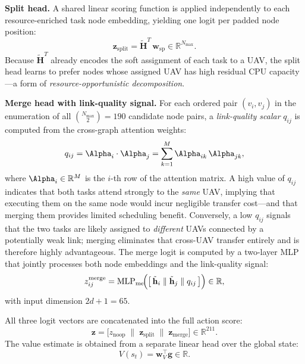 \noindent\textbf{Split head.}
A shared linear scoring function is applied independently to each
resource-enriched task node embedding, yielding one logit per
padded node position:
\begin{equation}
  \mathbf{z}_{\mathrm{split}} =
    \tilde{\mathbf{H}}^T\,\mathbf{w}_{\mathrm{sp}}
    \in \mathbb{R}^{N_{\max}}.
  \label{eq:z_split}
\end{equation}
Because $\tilde{\mathbf{H}}^T$ already encodes the soft assignment
of each task to a UAV, the split head learns to prefer nodes whose
assigned UAV has high residual CPU capacity—a form of
\emph{resource-opportunistic decomposition}.

\noindent\textbf{Merge head with link-quality signal.}
For each ordered pair $(v_i, v_j)$ in the enumeration of all
$\binom{N_{\max}}{2} = 190$ candidate node pairs, a
\textit{link-quality scalar} $q_{ij}$ is computed from the
cross-graph attention weights:
\begin{equation}
  q_{ij} = \boldsymbol{\Alpha}_i \cdot \boldsymbol{\Alpha}_j
          = \sum_{k=1}^{M} \Alpha_{ik}\,\Alpha_{jk},
  \label{eq:link_quality}
\end{equation}
where $\boldsymbol{\Alpha}_i \in \mathbb{R}^M$ is the $i$-th row of
the attention matrix.
A high value of $q_{ij}$ indicates that both tasks attend strongly to
the \emph{same} UAV, implying that executing them on the same node
would incur negligible transfer cost—and that merging them
provides limited scheduling benefit.
Conversely, a low $q_{ij}$ signals that the two tasks are likely
assigned to \emph{different} UAVs connected by a potentially weak
link; merging eliminates that cross-UAV transfer entirely and
is therefore highly advantageous.
The merge logit is computed by a two-layer MLP that jointly
processes both node embeddings and the link-quality signal:
\begin{equation}
  z_{ij}^{\mathrm{merge}} =
    \mathrm{MLP}_{\mathrm{me}}\!\Bigl(
      \bigl[\,
        \tilde{\mathbf{h}}_i \;\|\;
        \tilde{\mathbf{h}}_j \;\|\;
        q_{ij}
      \,\bigr]
    \Bigr) \in \mathbb{R},
  \label{eq:z_merge}
\end{equation}
with input dimension $2d + 1 = 65$.

All three logit vectors are concatenated into the full action score:
\begin{equation}
  \mathbf{z} = \bigl[
    z_{\mathrm{noop}}\;\|\;
    \mathbf{z}_{\mathrm{split}}\;\|\;
    \mathbf{z}_{\mathrm{merge}}
  \bigr] \in \mathbb{R}^{211}.
  \label{eq:logits}
\end{equation}
The value estimate is obtained from a separate linear head over
the global state:
\begin{equation}
  V(s_t) = \mathbf{w}_V^\top \mathbf{g} \in \mathbb{R}.
  \label{eq:value}
\end{equation}

